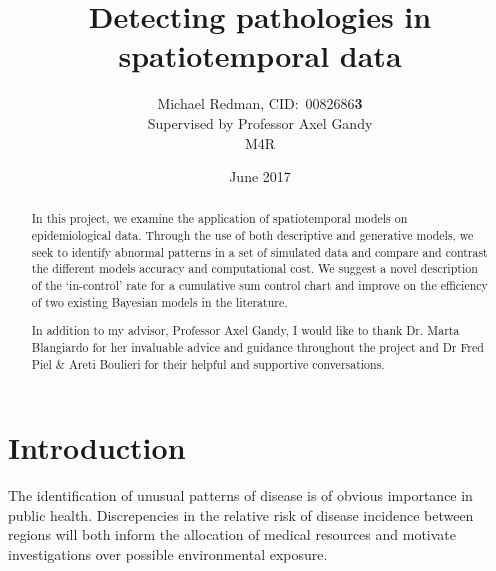 \documentclass[11pt]{report}
\begin{document}
\title{Detecting pathologies in spatiotemporal data}
\author{Michael Redman, CID:\ 0082686\textbf{3} \\%
Supervised by Professor Axel Gandy\\
M4R}
\date{June 2017}

\maketitle

\begin{abstract}
In this project, we examine the application of spatiotemporal models on epidemiological data. Through the use of both descriptive and generative models, we seek to identify abnormal patterns in a set of simulated data and compare and contrast the different models accuracy and computational cost. We suggest a novel description of the `in-control' rate for a cumulative sum control chart and improve on the efficiency of two existing Bayesian models in the literature.
\end{abstract}

\renewcommand{\abstractname}{Acknowledgements}
\begin{abstract}
In addition to my advisor, Professor Axel Gandy, I would like to thank Dr. Marta Blangiardo for her invaluable advice and guidance throughout the project and Dr Fred Piel \& Areti Boulieri for their helpful and supportive conversations.
\end{abstract}

\tableofcontents

\chapter{Introduction}

The identification of unusual patterns of disease is of obvious importance in public health. Discrepencies in the relative risk of disease incidence between regions will both inform the allocation of medical resources and motivate investigations over possible environmental exposure. \\
\end{document}
